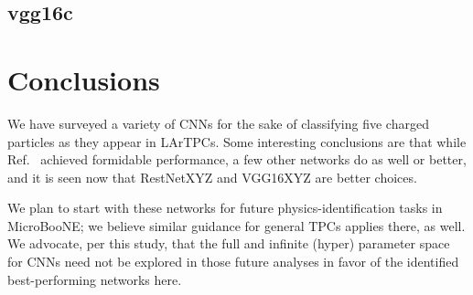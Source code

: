 \documentclass[11pt,a4paper]{article}
\begin{document}
\subsection{vgg16c}



\section {Conclusions}

We have surveyed a variety of CNNs for the sake of classifying five charged particles as they appear in LArTPCs. Some interesting conclusions are that while Ref.~\cite{uB-JINST} achieved formidable performance, a few other networks do as well or better, and it is seen now that RestNetXYZ and VGG16XYZ are better choices.

We plan to start with these networks for future physics-identification tasks in MicroBooNE; we believe similar guidance for general TPCs applies there, as well. We advocate, per this study, that the full and infinite (hyper) parameter space for CNNs need not be explored in those future analyses in favor of the identified best-performing networks here.

\end{document}
